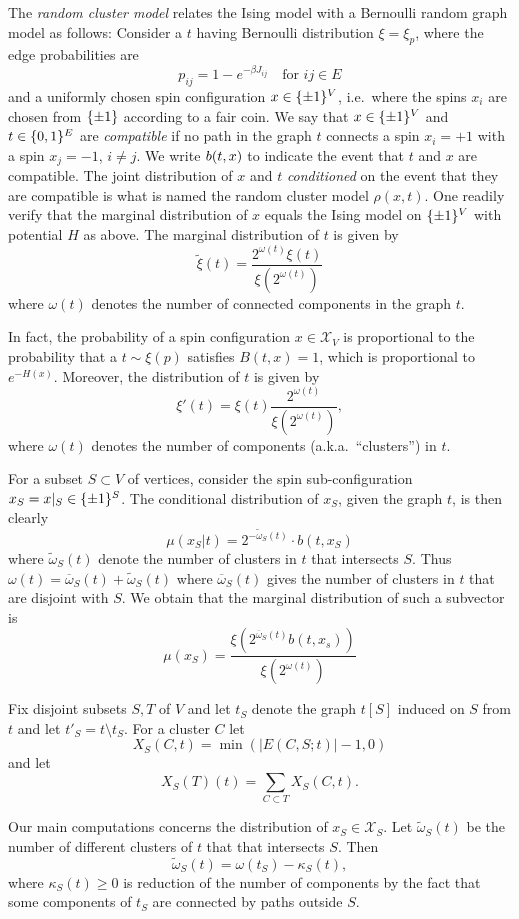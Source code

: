 \documentclass[11pt, a4paper, oneside]{article}
\theoremstyle{definition}
\theoremstyle{remark}
\providecommand{\mscr}{\mathscr}
\providecommand{\ol}{\overline}
\providecommand{\tl}{\tilde}
\def\X{\mscr X}
\begin{document}
The \emph{random cluster model} relates the Ising model with a Bernoulli random graph model as follows:
Consider a $t$ having Bernoulli distribution $\xi=\xi_p$, where the edge probabilities
are
\[ p_{ij} = 1 - e^{-\beta J_{ij}} \quad \text{for $ij\in E$}\] and a uniformly
chosen spin configuration $x\in\{\pm1\}^V$, i.e.\ where the spins $x_i$ are chosen
from $\{\pm1\}$ according to a fair coin. We say that $x\in \{\pm1\}^V$ and $t\in\{0,1\}^E$
are \emph{compatible} if no path in the graph $t$ connects a spin $x_i=+1$ with
a spin $x_j=-1$, $i\not=j$. We write $b(t,x)$ to indicate the event that $t$
and $x$ are compatible. The joint distribution of $x$ and $t$ \emph{conditioned}
on the event that they are compatible is what is named the random cluster model
$\rho(x,t)$. One readily verify that the marginal distribution of $x$ equals the
Ising model on $\{\pm1\}^V$ with potential $H$ as above. The marginal distribution of
$t$ is given by
\[
  \tl\xi(t) = \frac{2^{\omega(t)}\xi(t)}{\xi(2^{\omega(t)})}
\]
where $\omega(t)$ denotes the number of connected components in the graph $t$.

In fact, the probability of a spin configuration $x\in\X_V$ is
proportional to the probability that a $t\sim\xi(p)$ satisfies $B(t,x)=1$, which
is proportional to $e^{-H(x)}$. Moreover, the distribution of $t$ is given by
\[
  \xi'( t ) = \xi(t) \frac{2^{\omega(t)}}{\xi(2^{\omega(t)})},
\]
where $\omega(t)$ denotes the number of components (a.k.a.~``clusters'') in $t$.

For a subset $S\subset V$ of vertices, consider the spin sub-configuration $x_S=
x\vert_{S}\in\{\pm1\}^S$. The conditional distribution of $x_S$, given the graph $t$,
is then clearly
\[ \mu(x_S|t) = 2^{-\tl\omega_S(t)} \cdot b(t,x_S)\] 
where $\tl\omega_S(t)$ denote the number of clusters in $t$ that intersects $S$.
Thus
\(\omega(t)=\ol\omega_S(t)+\tl\omega_S(t)\) where $\ol\omega_S(t)$ gives the
number of clusters in $t$ that are disjoint with $S$. We obtain that the
marginal distribution of such a subvector is 
\[
  \mu(x_S) = \frac{\xi\left(2^{\ol\omega_S(t)} b(t,x_s)\right)}{\xi\left( 2^{\omega(t)} \right)}
\]



Fix disjoint subsets $S,T$ of $V$ and let $t_S$ denote the graph $t[S]$ induced
on $S$ from $t$ and let $t'_S=t\setminus t_S$. For a cluster $C$ let
\[ X_S(C,t) = \min\left( |E(C,S;t)| - 1, 0\right) \] and let
\[ X_S(T)(t) = \sum_{C\subset T} X_S(C,t). \]



Our main computations concerns the distribution of $x_S\in \X_S$. Let
$\tl\omega_S(t)$ be the number of different clusters of $t$ that that intersects
$S$. Then
\[
  \tl\omega_S(t) = \omega(t_S) - \kappa_S(t),
\]
where $\kappa_S(t)\ge 0$ is reduction of the number of components by the fact
that some components of $t_S$ are connected by paths outside $S$.
\end{document}
